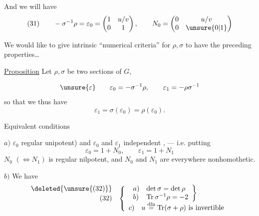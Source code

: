 And we will have
\[
(31)\qquad
-\sigma^{-1}\rho=\varepsilon_0
=\begin{pmatrix}1&u/v\\0&1\end{pmatrix},
\qquad
N_0=\begin{pmatrix}0&u/v\\0&\unsure{0|1}\end{pmatrix}
\]



We would like to give intrinsic ``numerical criteria'' for $\rho,\sigma$ to have the preceding properties\ldots

\uline{Proposition} Let $\rho,\sigma$ be two  sections of $G$,

 
\[
\unsure{\varepsilon}\qquad \varepsilon_0=-\sigma^{-1}\rho,\qquad \varepsilon_1=-\rho\sigma^{-1}
\]
so that we thus have
\[
\varepsilon_1=\sigma(\varepsilon_0)=\rho(\varepsilon_0).
\]

Equivalent conditions

$a)$  $\varepsilon_0$        regular unipotent) and  $\varepsilon_0$ and $\varepsilon_1$   independent , --- i.e. putting
\[
\varepsilon_0=1+N_0,\qquad \varepsilon_1=1+N_1
\]
$N_0$ $(\Leftrightarrow N_1)$ is regular nilpotent, and $N_0$ and $N_1$ are everywhere nonhomothetic.

$b)$ We have
\[
\begin{array}{rl}
\deleted{\unsure{(32)}}&\\[-1.2em]
(32)&\left\{\begin{array}{l}
\left.\begin{array}{ll}
a)&\det\sigma=\det\rho\\
b)&\operatorname{Tr}\sigma^{-1}\rho=-2
\end{array}\right\}\\
c)\quad u\overset{\mathrm{dfn}}{=}\operatorname{Tr}(\sigma+\rho)\text{ is invertible}
\end{array}\right.
\end{array}
\]
 

